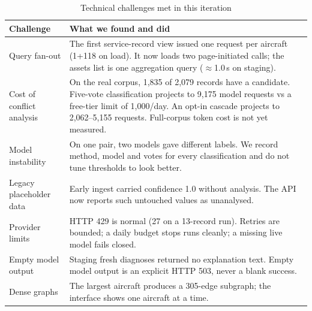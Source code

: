 \begin{table}[H]
\centering
\caption{Technical challenges met in this iteration}
\label{tab:tech-challenges}
\small
\begin{tabularx}{\textwidth}{@{}>{\raggedright\arraybackslash}p{} L@{}}
\toprule
Challenge & What we found and did \\
\midrule
Query fan-out & The first service-record view issued one request per aircraft (1+118 on load). It now loads two page-initiated calls; the assets list is one aggregation query ($\approx$1.0\,s on staging). \\
Cost of conflict analysis & On the real corpus, 1{,}835 of 2{,}079 records have a candidate. Five-vote classification projects to 9{,}175 model requests vs a free-tier limit of 1{,}000/day. An opt-in cascade projects to 2{,}062--5{,}155 requests. Full-corpus token cost is not yet measured. \\
Model instability & On one pair, two models gave different labels. We record method, model and votes for every classification and do not tune thresholds to look better. \\
Legacy placeholder data & Early ingest carried confidence 1.0 without analysis. The API now reports such untouched values as unanalysed. \\
Provider limits & HTTP 429 is normal (27 on a 13-record run). Retries are bounded; a daily budget stops runs cleanly; a missing live model fails closed. \\
Empty model output & Staging fresh diagnoses returned no explanation text. Empty model output is an explicit HTTP 503, never a blank success. \\
Dense graphs & The largest aircraft produces a 305-edge subgraph; the interface shows one aircraft at a time. \\
\bottomrule
\end{tabularx}
\end{table}
